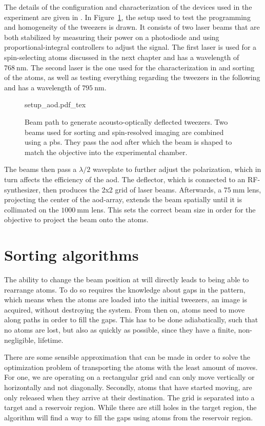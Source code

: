 The details of the configuration and characterization of the devices used in the experiment are given in \cite{Osterholz2020}.
In Figure~\ref{fig:setup_aod}, the setup used to test the programming and homogeneity of the tweezers is drawn. It consists of two laser beams that are both stabilized by measuring their power on a photodiode and using proportional-integral controllers to adjust the signal. The first laser is used for a spin-selecting atoms discussed in the next chapter and has a wavelength of $\SI{768}{\nano\meter}$. The second laser is the one used for the characterization in \cite{Osterholz2020} and sorting of the atoms, as well as testing everything regarding the tweezers in the following and has a wavelength of $\SI{795}{\nano\meter}$.

\begin{figure}[t]
\label{fig:setup_aod}
\centering
	{setup_aod.pdf_tex}
	\caption{Beam path to generate acousto-optically deflected tweezers. Two beams used for sorting and spin-resolved imaging are combined using a \ac{pbs}. They pass the \ac{aod} after which the beam is shaped to match the objective into the experimental chamber.}
\end{figure}

The beams then pass a $\lambda/2$ waveplate to further adjust the polarization, which in turn affects the efficiency of the \ac{aod}. The deflector, which is connected to an RF-synthesizer, then produces the 2x2 grid of laser beams. Afterwards, a $\SI{75}{\milli\meter}$ lens, projecting the center of the \ac{aod}-array, extends the beam spatially until it is collimated on the $\SI{1000}{\milli\meter}$ lens. This sets the correct beam size in order for the objective to project the beam onto the atoms.

\section{Sorting algorithms}

The ability to change the beam position at will directly leads to being able to rearrange atoms. To do so requires the knowledge about gaps in the pattern, which means when the atoms are loaded into the initial tweezers, an image is acquired, without destroying the system. From then on, atoms need to move along paths in order to fill the gaps. This has to be done adiabatically, such that no atoms are lost, but also as quickly as possible, since they have a finite, non-negligible, lifetime.

There are some sensible approximation that can be made in order to solve the optimization problem of transporting the atoms with the least amount of moves. For one, we are operating on a rectangular grid and can only move vertically or horizontally and not diagonally. Secondly, atoms that have started moving, are only released when they arrive at their destination.
The grid is separated into a target and a reservoir region. While there are still holes in the target region, the algorithm will find a way to fill the gaps using atoms from the reservoir region.

